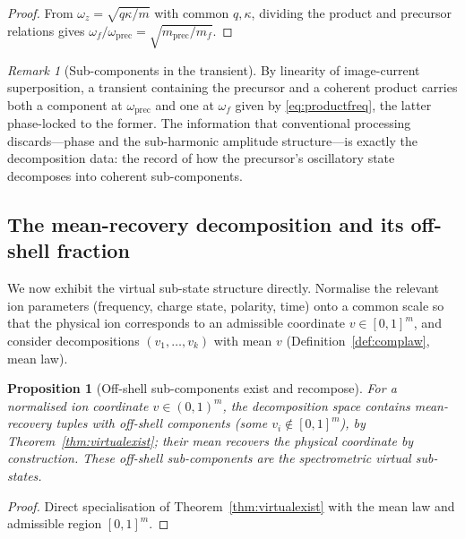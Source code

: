 \documentclass[11pt,a4paper]{article}
\theoremstyle{thmstyle}
\newtheorem{proposition}[theorem]{Proposition}
\theoremstyle{definition}
\theoremstyle{remark}
\newtheorem{remark}[theorem]{Remark}
\begin{document}
\begin{proof}
From $\omega_z=\sqrt{q\kappa/m}$ with common $q,\kappa$, dividing the
product and precursor relations gives
$\omega_f/\omega_{\mathrm{prec}}=\sqrt{m_{\mathrm{prec}}/m_f}$.
\end{proof}

\begin{remark}[Sub-components in the transient]
\label{rem:transientcomponents}
By linearity of image-current superposition, a transient containing the
precursor and a coherent product carries both a component at
$\omega_{\mathrm{prec}}$ and one at $\omega_f$ given by
\eqref{eq:productfreq}, the latter phase-locked to the former. The
information that conventional processing discards---phase and the
sub-harmonic amplitude structure---is exactly the decomposition data: the
record of how the precursor's oscillatory state decomposes into coherent
sub-components.
\end{remark}

\subsection{The mean-recovery decomposition and its off-shell fraction}
\label{sec:meanrecovery}

We now exhibit the virtual sub-state structure directly. Normalise the
relevant ion parameters (frequency, charge state, polarity, time) onto a
common scale so that the physical ion corresponds to an admissible
coordinate $v\in[0,1]^m$, and consider decompositions $(v_1,\dots,v_k)$
with mean $v$ (Definition~\ref{def:complaw}, mean law).

\begin{proposition}[Off-shell sub-components exist and recompose]
\label{prop:msoffshell}
For a normalised ion coordinate $v\in(0,1)^m$, the decomposition space
contains mean-recovery tuples with off-shell components (some
$v_i\notin[0,1]^m$), by Theorem~\ref{thm:virtualexist}; their mean recovers
the physical coordinate by construction. These off-shell sub-components are
the spectrometric virtual sub-states.
\end{proposition}

\begin{proof}
Direct specialisation of Theorem~\ref{thm:virtualexist} with the mean law
and admissible region $[0,1]^m$.
\end{proof}
\end{document}
